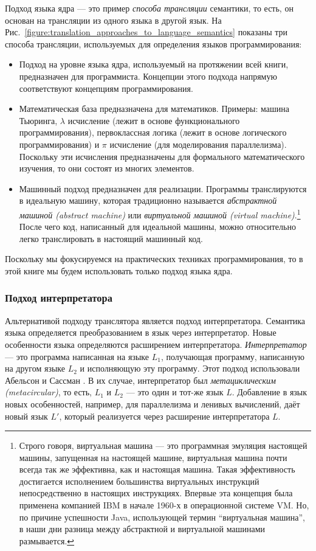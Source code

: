 Подход языка ядра --- это пример \emph{способа трансляции} семантики, то есть, он основан на трансляции из одного языка в другой язык. На Рис.~\ref{figure:translation_approaches_to_language_semantics} показаны три способа трансляции, используемых для определения языков программирования:

\begin{itemize}
\item{Подход на уровне языка ядра, используемый на протяжении всей книги, предназначен для программиста. Концепции этого подхода напрямую соответствуют концепциям программирования.}

\item{Математическая база предназначена для математиков. Примеры: машина Тьюринга, $\lambda$ исчисление (лежит в основе функционального программирования), первоклассная логика (лежит в основе логического программирования) и $\pi$ исчисление (для моделирования параллелизма). Поскольку эти исчисления предназначены для формального математического изучения, то они состоят из многих элементов.}

\item{Машинный подход предназначен для реализации. Программы транслируются в идеальную машину, которая традиционно называется \emph{абстрактной машиной (abstract machine)} или \emph{виртуальной машиной (virtual machine)}.\footnote{Строго говоря, виртуальная машина --- это программная эмуляция настоящей машины, запущенная на настоящей машине, виртуальная машина почти всегда так же эффективна, как и настоящая машина. Такая эффективность достигается исполнением большинства виртуальных инструкций непосредственно в настоящих инструкциях. Впервые эта концепция была применена компанией IBM в начале 1960-х в операционной системе VM. Но, по причине успешности Java, использующей термин ``виртуальная машина'', в наши дни разница между абстрактной и виртуальной машинами размывается.} После чего код, написанный для идеальной машины, можно относительно легко транслировать в настоящий машинный код.}
\end{itemize}

Поскольку мы фокусируемся на практических техниках программирования, то в этой книге мы будем использовать только подход языка ядра.

\subsubsection{Подход интерпретатора}

Альтернативой подходу транслятора является подход интерпретатора. Семантика языка определяется преобразованием в язык через интерпретатор. Новые особенности языка определяются расширением интерпретатора. \emph{Интерпретатор} --- это программа написанная на языке $L_1$, получающая программу, написанную на другом языке $L_2$ и исполняющую эту программу. Этот подход использовали Абельсон и Сассман \cite{2}. В их случае, интерпретатор был \emph{метациклическим (metacircular)}, то есть, $L_1$ и $L_2$ --- это один и тот-же язык $L$. Добавление в язык новых особенностей, например, для параллелизма и ленивых вычислений, даёт новый язык $L'$, который реализуется через расширение интерпретатора $L$.

